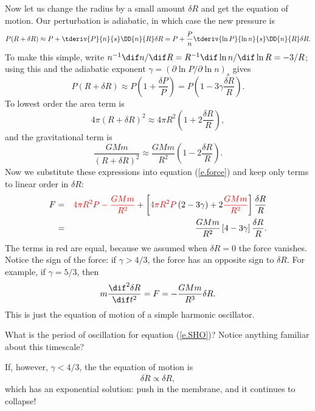 Now let us change the radius by a small amount $\delta R$ and get the equation of motion. Our perturbation is adiabatic, in which case the new pressure is
\[ 
	P(R+\delta R) \approx P + \tderiv{P}{n}{s}\DD{n}{R}\delta R 
	= P + \frac{P}{n}\tderiv{\ln P}{\ln n}{s} \DD{n}{R}\delta R. 
\]
To make this simple, write $n^{-1}\dif n/\dif R = R^{-1}\dif\ln n/\dif\ln R = -3/R$; using this and the adiabatic exponent $\gamma = (\partial\ln P/\partial\ln n)_{s}$ gives
\[
	P(R+\delta R) \approx P\left(1 + \frac{\delta P}{P}\right) 
	= P\left(1 - 3\gamma \frac{\delta R}{R}\right).
\]
To lowest order the area term is
\[ 4\pi (R+\delta R)^{2} \approx 4\pi R^{2}\left(1 + 2\frac{\delta R}{R}\right), \]
and the gravitational term is
\[
	\frac{GMm}{(R+\delta R)^{2}} \approx \frac{GMm}{R^{2}}\left(1-2\frac{\delta R}{R}\right).
\]
Now we substitute these expressions into equation (\ref{e.force}) and keep only terms to linear order in $\delta R$:
\begin{eqnarray}
	F &=& \color{red} 4\pi R^{2} P - \frac{GMm}{R^{2}}
	\color{black} + \left[{\color{red}4\pi R^{2}P}\left( 2 - 3\gamma \right) + 2 {\color{red}\frac{GMm}{R^{2}}} \right ] \frac{\delta R}{R} \nonumber\\
	&=& \frac{GMm}{R^{2}} \left[4 - 3\gamma\right]\frac{\delta R}{R}.
\end{eqnarray}
The terms in red are equal, because we assumed when $\delta R = 0$ the force vanishes.  Notice the sign of the force: if $\gamma > 4/3$, the force has an opposite sign to $\delta R$. For example, if $\gamma = 5/3$, then 
\begin{equation}\label{e.SHO}
	m\frac{\dif^{2}\delta R}{\dif t^{2}} = F  = - \frac{GMm}{R^{3}}\delta R.
\end{equation}
This is just the equation of motion of a simple harmonic oscillator.

\begin{exercisebox}
What is the period of oscillation for equation (\ref{e.SHO})?  Notice anything familiar about this timescale?
\end{exercisebox}

\noindent If, however, $\gamma < 4/3$, the the equation of motion is
\[ \delta\ddot{R} \propto \delta R, \]
which has an exponential solution: push in the membrane, and it continues to collapse!

